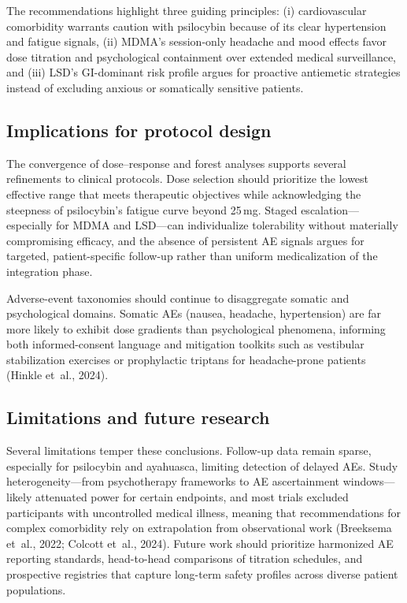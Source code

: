 The recommendations highlight three guiding principles: (i) cardiovascular comorbidity warrants caution with psilocybin because of its clear hypertension and fatigue signals, (ii) MDMA’s session-only headache and mood effects favor dose titration and psychological containment over extended medical surveillance, and (iii) LSD’s GI-dominant risk profile argues for proactive antiemetic strategies instead of excluding anxious or somatically sensitive patients.

\subsection{Implications for protocol design}

The convergence of dose--response and forest analyses supports several refinements to clinical protocols.
Dose selection should prioritize the lowest effective range that meets therapeutic objectives while acknowledging the steepness of psilocybin’s fatigue curve beyond 25\,mg.
Staged escalation---especially for MDMA and LSD---can individualize tolerability without materially compromising efficacy, and the absence of persistent AE signals argues for targeted, patient-specific follow-up rather than uniform medicalization of the integration phase.

Adverse-event taxonomies should continue to disaggregate somatic and psychological domains.
Somatic AEs (nausea, headache, hypertension) are far more likely to exhibit dose gradients than psychological phenomena, informing both informed-consent language and mitigation toolkits such as vestibular stabilization exercises or prophylactic triptans for headache-prone patients (Hinkle et~al., 2024).

\subsection{Limitations and future research}

Several limitations temper these conclusions.
Follow-up data remain sparse, especially for psilocybin and ayahuasca, limiting detection of delayed AEs.
Study heterogeneity---from psychotherapy frameworks to AE ascertainment windows---likely attenuated power for certain endpoints, and most trials excluded participants with uncontrolled medical illness, meaning that recommendations for complex comorbidity rely on extrapolation from observational work (Breeksema et~al., 2022; Colcott et~al., 2024).
Future work should prioritize harmonized AE reporting standards, head-to-head comparisons of titration schedules, and prospective registries that capture long-term safety profiles across diverse patient populations.

